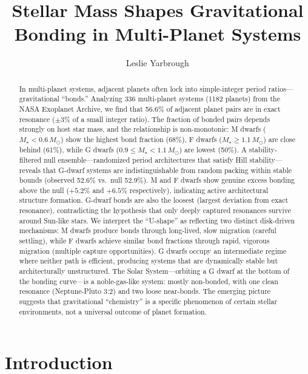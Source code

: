 \documentclass[twocolumn]{aastex631}
\begin{document}
\title{Stellar Mass Shapes Gravitational Bonding in Multi-Planet Systems}

\author{Leslie Yarbrough}

\graphicspath{{../figures/}}

\begin{abstract}
In multi-planet systems, adjacent planets often lock into simple-integer period
ratios---gravitational ``bonds.'' Analyzing 336 multi-planet systems (1182
planets) from the NASA Exoplanet Archive, we find that 56.6\% of adjacent planet
pairs are in exact resonance ($\pm 3\%$ of a small integer ratio). The fraction
of bonded pairs depends strongly on host star mass, and the relationship is
non-monotonic: M dwarfs ($M_\star < 0.6\,M_\odot$) show the highest bond
fraction (68\%), F dwarfs ($M_\star \geq 1.1\,M_\odot$) are close behind (61\%),
while G dwarfs ($0.9 \leq M_\star < 1.1\,M_\odot$) are lowest (50\%). A
stability-filtered null ensemble---randomized period architectures that satisfy
Hill stability---reveals that G-dwarf systems are indistinguishable from random
packing within stable bounds (observed 52.6\% vs.\ null 52.9\%). M and F dwarfs
show genuine excess bonding above the null ($+5.2\%$ and $+6.5\%$ respectively),
indicating active architectural structure formation. G-dwarf bonds are also the
loosest (largest deviation from exact resonance), contradicting the hypothesis
that only deeply captured resonances survive around Sun-like stars. We interpret
the ``U-shape'' as reflecting two distinct disk-driven mechanisms: M dwarfs
produce bonds through long-lived, slow migration (careful settling), while F
dwarfs achieve similar bond fractions through rapid, vigorous migration
(multiple capture opportunities). G dwarfs occupy an intermediate regime where
neither path is efficient, producing systems that are dynamically stable but
architecturally unstructured. The Solar System---orbiting a G dwarf at the
bottom of the bonding curve---is a noble-gas-like system: mostly non-bonded,
with one clean resonance (Neptune-Pluto 3:2) and two loose near-bonds. The
emerging picture suggests that gravitational ``chemistry'' is a specific
phenomenon of certain stellar environments, not a universal outcome of planet
formation.
\end{abstract}

\section{Introduction}
\label{sec:intro}
\end{document}
